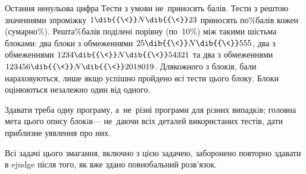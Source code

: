 \begin{problemAllDefault}{Остання ненульова цифра}
\Scoring
Тести з умови не~приносять балів. Тести з рештою\nolinebreak[2] 
значеннями з\nolinebreak[3] проміжку
$1\dib{{\<}}N\dib{{\<}}23$ приносять по\%\nolinebreak[3] балів кожен (сумарно\%).
Решта\%\nolinebreak[3] балів поділені порівну (по~10\%) між такими шістьма блоками: 
два блоки з обмеженнями $25\dib{{\<}}N\dib{{\<}}555$,
два з обмеженнями $1234\dib{{\<}}N\dib{{\<}}54321$ та
два з обмеженнями $123456\dib{{\<}}N\dib{{\<}}2018019$.
Для\nolinebreak[3] кожного з блоків, бали нараховуються, лише якщо успішно пройдено \emph{всі} тести цього блоку. Блоки оцінюються незалежно 
один від одного.

Здавати треба одну програму, а~не~різні програми для рiзних випадкiв; головна
мета цього опису блокiв\nolinebreak[3] --- не~даючи всіх деталей використаних тестів, дати приблизне уявлення про них. 

\ifStatementOnly
\vfill\par
Всі задачі цього змагання, включно з цією задачею, заборонено повторно здавати в ejudge після того, як вже здано повнобальний розв'язок.
\fi


% 
% 
% 
% 


\end{problemAllDefault}
